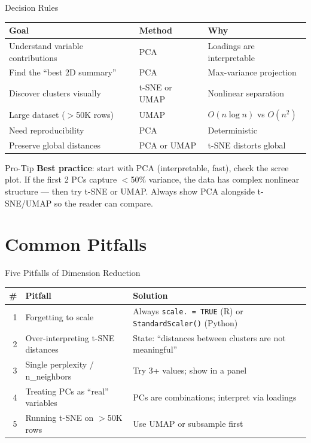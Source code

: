 \documentclass[10pt]{beamer}
\begin{document}
\begin{frame}{Decision Rules}
  \centering
  \begin{tabular}{lll}
    \toprule
    \textbf{Goal} & \textbf{Method} & \textbf{Why} \\
    \midrule
    Understand variable contributions & PCA & Loadings are interpretable \\
    Find the ``best 2D summary'' & PCA & Max-variance projection \\
    Discover clusters visually & t-SNE or UMAP & Nonlinear separation \\
    Large dataset ($>$50K rows) & UMAP & $O(n \log n)$ vs $O(n^2)$ \\
    Need reproducibility & PCA & Deterministic \\
    Preserve global distances & PCA or UMAP & t-SNE distorts global \\
    \bottomrule
  \end{tabular}
  \vspace{6pt}
  \begin{alertblock}{Pro-Tip}
    \textbf{Best practice}: start with PCA (interpretable, fast), check
    the scree plot. If the first 2 PCs capture $<$50\% variance, the
    data has complex nonlinear structure --- then try t-SNE or UMAP.
    Always show PCA alongside t-SNE/UMAP so the reader can compare.
  \end{alertblock}
\end{frame}

\section{Common Pitfalls}

\begin{frame}{Five Pitfalls of Dimension Reduction}
  \centering
  \begin{tabular}{rlp{5cm}}
    \toprule
    \textbf{\#} & \textbf{Pitfall} & \textbf{Solution} \\
    \midrule
    1 & Forgetting to scale & Always \texttt{scale. = TRUE} (R) or \texttt{StandardScaler()} (Python) \\
    2 & Over-interpreting t-SNE distances & State: ``distances between clusters are not meaningful'' \\
    3 & Single perplexity / n\_neighbors & Try 3+ values; show in a panel \\
    4 & Treating PCs as ``real'' variables & PCs are combinations; interpret via loadings \\
    5 & Running t-SNE on $>$50K rows & Use UMAP or subsample first \\
    \bottomrule
  \end{tabular}
\end{frame}
\end{document}
